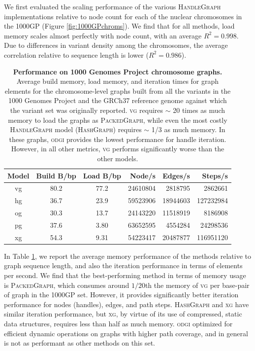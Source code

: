 \documentclass{bioinfo}
\begin{document}
We first evaluated the scaling performance of the various \textsc{HandleGraph} implementations relative to node count for each of the nuclear chromosomes in the 1000GP (Figure \ref{fig:1000GPchroms}).
We find that for all methods, load memory scales almost perfectly with node count, with an average $R^2 = 0.998$.
Due to differences in variant density among the chromosomes, the average correlation relative to sequence length is lower ($R^2 = 0.986$).

\begin{table}
  \centering
\begin{tabular}{c||c|c|r|r|r}
Model & Build B/bp & Load B/bp & Node/s & Edges/s & Steps/s \\
\hline
vg &   80.2 &   77.2  &   24610804 &    2818795 &     2862661 \\
hg &   36.7 &   23.9  &   59523906 &   18944603 &   127232984 \\
og &   30.3 &   13.7  &   24143220 &   11518919 &     8186908 \\
pg &   37.6 &   3.80  &   63652595 &    4554284 &    24298536 \\
xg &   54.3 &   9.31  &   54223417 &   20487877 &   116951120 \\
\hline
\end{tabular}
\caption{
  \textbf{Performance on 1000 Genomes Project chromosome graphs.}
  Average build memory, load memory, and iteration times for graph elements for the chromosome-level graphs built from all the variants in the 1000 Genomes Project and the GRCh37 reference genome against which the variant set was originally reported.
  \textsc{vg} requires $\sim$ 20 times as much memory to load the graphs as \textsc{PackedGraph}, while even the most costly \textsc{HandleGraph} model (\textsc{HashGraph}) requires $\sim$ 1/3 as much memory.
  In these graphs, \textsc{odgi} provides the lowest performance for handle iteration.
  However, in all other metrics, \textsc{vg} performs significantly worse than the other models.
}
\label{table:1000GPchroms}
\end{table}

In Table \ref{table:1000GPchroms}, we report the average memory performance of the methods relative to graph sequence length, and also the iteration performance in terms of elements per second.
We find that the best-performing method in terms of memory usage is \textsc{PackedGraph}, which consumes around $1/20$th the memory of \textsc{vg} per base-pair of graph in the 1000GP set.
However, it provides significantly better iteration performance for nodes (handles), edges, and path steps.
\textsc{HashGraph} and \textsc{xg} have similar iteration performance, but \textsc{xg}, by virtue of its use of compressed, static data structures, requires less than half as much memory.
\textsc{odgi} optimized for efficient dynamic operations on graphs with higher path coverage, and in general is not as performant as other methods on this set.
\end{document}
